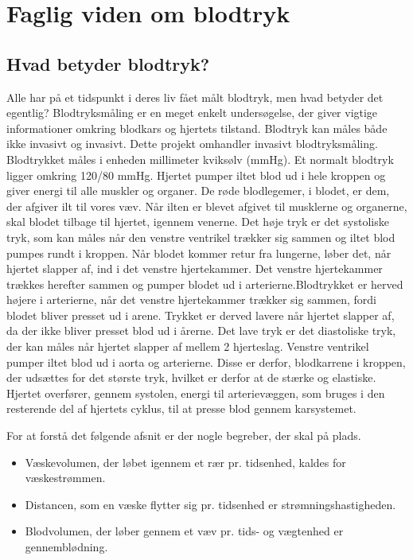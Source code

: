 \chapter{Faglig viden om blodtryk}
\section{Hvad betyder blodtryk?} 
Alle har på et tidspunkt i deres liv fået målt blodtryk, men hvad betyder det egentlig?
Blodtryksmåling er en meget enkelt undersøgelse, der giver vigtige informationer omkring blodkars og hjertets tilstand. Blodtryk kan måles både ikke invasivt og invasivt. Dette projekt omhandler invasivt blodtryksmåling. 
Blodtrykket måles i enheden millimeter kviksølv (mmHg). Et normalt blodtryk ligger omkring 120/80 mmHg. 
Hjertet pumper iltet blod ud i hele kroppen og giver energi til alle muskler og organer. De røde blodlegemer, i blodet, er dem, der afgiver ilt til vores væv. Når ilten er blevet afgivet til musklerne og organerne, skal blodet tilbage til hjertet, igennem venerne.  
Det høje tryk er det systoliske tryk, som kan måles når den venstre ventrikel trækker sig sammen og iltet blod pumpes rundt i kroppen. 
Når blodet kommer retur fra lungerne, løber det, når hjertet slapper af, ind i det venstre hjertekammer. Det venstre hjertekammer trækkes herefter sammen og pumper blodet ud i arterierne.Blodtrykket er herved højere i arterierne, når det venstre hjertekammer trækker sig sammen, fordi blodet bliver presset ud i arene. Trykket er derved lavere når hjertet slapper af, da der ikke bliver presset blod ud i årerne. 
Det lave tryk er det diastoliske tryk, der kan måles når hjertet slapper af mellem 2 hjerteslag. 
Venstre ventrikel pumper iltet blod ud i aorta og arterierne. Disse er derfor, blodkarrene i kroppen, der udsættes for det største tryk, hvilket er derfor at de stærke og elastiske. 
Hjertet overfører, gennem systolen, energi til arterievæggen, som bruges i den resterende del af hjertets cyklus, til at presse blod gennem karsystemet. 

For at forstå det følgende afsnit er der nogle begreber, der skal på plads. 
\begin{itemize}
\item Væskevolumen, der løbet igennem et rær pr. tidsenhed, kaldes for væskestrømmen.
\item Distancen, som en væske flytter sig pr. tidsenhed er strømningshastigheden.
\item Blodvolumen, der løber gennem et væv pr. tids- og vægtenhed er gennemblødning.
\end{itemize}


